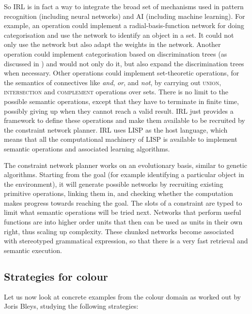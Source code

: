 So IRL is in fact a way to integrate the broad set of mechanisms used in 
pattern recognition (including neural networks) and AI (including machine learning). 
For example, an operation could implement a radial-basis-function network for doing categorisation and 
use the network to identify an object in a set. It could not only use the network but also adapt 
the weights in the network. Another operation could implement categorisation based 
on discrimination trees (as discussed in ) and would not only do it, but also expand the discrimination trees 
when necessary. Other operations could implement set-theoretic operations, 
for the semantics of connectives like {\itshape and}, {\itshape or}, and {\itshape not}, by carrying out
{\scshape union}, {\scshape intersection} and {\scshape complement} operations over sets. There is no 
limit to the possible semantic operations, except that they have to terminate in finite time, possibly giving up when 
they cannot reach a valid result. IRL just provides a framework to define these operations and make them available 
to be recruited by the constraint network planner. IRL uses LISP as the host language, which means that all 
the computational machinery of LISP is available to implement semantic operations and associated learning algorithms. 

The constraint network planner works on an evolutionary basis, similar to genetic algorithms. Starting from the goal 
(for example identifying a particular object in the environment), it will generate possible networks by recruiting 
existing primitive operations, linking them in, and checking whether the computation makes progress towards reaching the goal. 
The slots of a constraint are typed to limit what semantic operations will be tried next. Networks that perform useful 
functions are  into higher order units that then can be used as units in their own right, thus scaling up 
complexity. These chunked networks become associated with stereotyped grammatical expression, so that there is a very 
fast retrieval and semantic execution.
\subsection{Strategies for colour}

Let us now look at concrete examples from the colour domain as worked out by Joris Bleys, studying the following 
strategies: 

